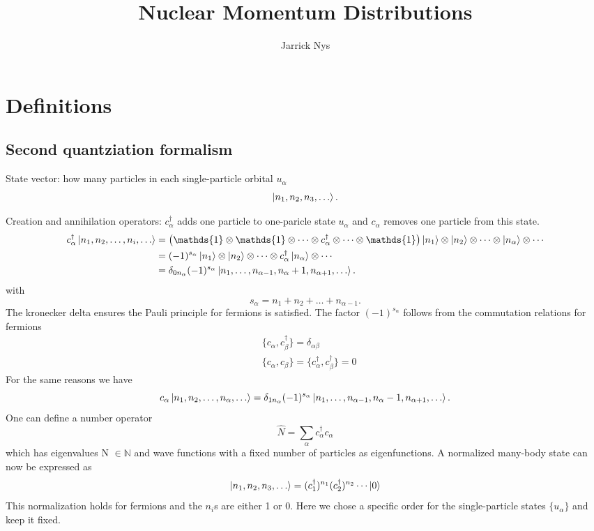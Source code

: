 \documentclass[12pt]{article}
\title{Nuclear Momentum Distributions}
\author{Jarrick Nys}
\begin{document}
\maketitle
\section{Definitions}

\subsection{Second quantziation formalism}
State vector: how many particles in each single-particle orbital $u_\alpha$
\begin{equation}
\ket{n_1, n_2, n_3 , \ldots}.
\end{equation}

Creation and annihilation operators: $c^\dagger_\alpha$ adds one particle to one-paricle state $u_\alpha$ and $c_\alpha$ removes one particle from this state.
\begin{align}
c^\dagger_\alpha\ket{n_1, n_2, \ldots, n_i, \ldots} & = \left(\mathds{1} \otimes \mathds{1} \otimes \cdots \otimes c^\dagger_\alpha \otimes  \cdots \otimes \mathds{1} \right) \ket{n_1} \otimes \ket{n_2} \otimes \cdots \otimes \ket{n_\alpha} \otimes \cdots \\
& = (-1)^{s_\alpha}\ket{n_1} \otimes \ket{n_2} \otimes \cdots \otimes c^\dagger_\alpha \ket{n_\alpha} \otimes \cdots \\
& = \delta_{0n_\alpha}(-1)^{s_\alpha}\ket{n_1, \ldots, n_{\alpha-1},  n_\alpha+1,  n_{\alpha+1}, \ldots }.
\end{align}
with
\begin{equation}
s_\alpha= n_1 + n_2 + \ldots + n_{\alpha-1}.
\end{equation}
The kronecker delta ensures the Pauli principle for fermions is satisfied. The factor $(-1)^{s_\alpha}$ follows from the commutation relations for fermions
\begin{align}
& \{c_\alpha, c^\dagger_\beta \} = \delta_{\alpha \beta} \\
& \{c_\alpha, c_\beta \} =\{c^\dagger_\alpha, c^\dagger_\beta \}  = 0
\end{align}
For the same reasons we have
\begin{equation}
c_\alpha \ket{n_1, n_2, \ldots, n_\alpha, \ldots} = \delta_{1n_\alpha}(-1)^{s_\alpha}\ket{n_1, \ldots, n_{\alpha-1},  n_\alpha-1,  n_{\alpha+1}, \ldots }.
\end{equation}
One can define a number operator
\begin{equation}
\hat{N} = \sum_\alpha c^\dagger_\alpha c_\alpha
\end{equation}
which has eigenvalues N $\in \mathds{N}$ and wave functions with a fixed number of particles as eigenfunctions. A normalized many-body state can now be expressed as
\begin{equation}
\ket{n_1, n_2, n_3 , \ldots} = (c^\dagger_1)^{n_1} (c^\dagger_2)^{n_2} \cdots \ket{0}
\end{equation}
This normalization holds for fermions and the $n_i$s are either 1 or 0. Here we chose a specific order for the single-particle states $\{u_\alpha\}$ and keep it fixed. 
\end{document}
